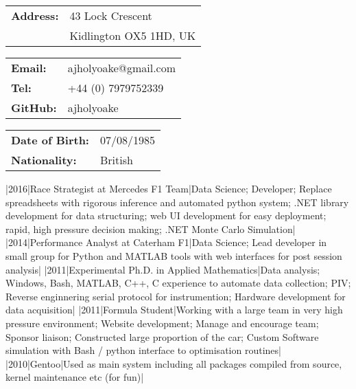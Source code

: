 \documentclass[a4paper,10pt]{article}
\begin{document}
\small
\smallskip
\vspace*{0.0cm}

{\begin{tabular}{ll}
\textbf{Address:} & 43 Lock Crescent\\
 & Kidlington OX5 1HD, UK\\
\end{tabular}}
{\begin{tabular}{ll}
\textbf{Email:} & ajholyoake@gmail.com\\
   \textbf{Tel:} & +44 (0) 7979752339 \\
   \textbf{GitHub:} & ajholyoake \\
\end{tabular}}
{\begin{tabular}{ll}
\textbf{Date of Birth:} & 07/08/1985 \\
\textbf{Nationality:} & British \\
\end{tabular}}

\normalsize
\begin{cvsection}
   |2016|Race Strategist at Mercedes F1 Team|Data Science; Developer; Replace spreadsheets with
   rigorous inference and automated python system; .NET library development for
   data structuring; web UI development for easy deployment; rapid, high
   pressure decision making; .NET Monte Carlo Simulation|
   |2014|Performance Analyst at Caterham F1|Data Science; Lead developer
   in small group for Python and MATLAB tools with web interfaces for post session analysis|
   |2011|Experimental Ph.D. in Applied Mathematics|Data analysis;
   Windows, Bash, MATLAB, C++, C experience to automate data collection; PIV;
   Reverse enginnering serial protocol for instrumention; Hardware development
   for data acquisition|
   |2011|Formula Student|Working with a large team in very high pressure
   environment; Website development; Manage and encourage team; Sponsor liaison; Constructed large
   proportion of the car; Custom Software simulation with Bash / python
   interface to optimisation routines|
   |2010|Gentoo|Used as main system including all packages compiled from
   source, kernel maintenance etc (for fun)|
\end{cvsection}


\end{document}
